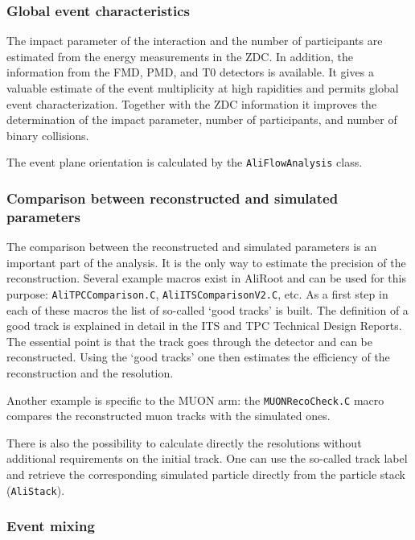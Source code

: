 \documentclass[12pt,a4paper,twoside]{article}
\makeatletter
\newcommand {\aliroot} {AliRoot\@\xspace}
\makeatother
\begin{document}
{\subsubsection{Global event characteristics}

The impact parameter of the interaction and the number of participants
are estimated from the energy measurements in the ZDC. In addition,
the information  from the FMD, PMD, and T0 detectors is available. It
gives a valuable estimate of the event multiplicity at high rapidities
and permits global event characterization. Together with the ZDC
information it improves the determination of the impact parameter,
number of participants, and number of binary collisions.

The event plane orientation is calculated by the \texttt{AliFlowAnalysis} class.

\subsubsection{Comparison between reconstructed and simulated parameters}

The comparison between the reconstructed and simulated parameters is
an important part of the analysis. It is the only way to estimate the
precision of the reconstruction. Several example macros exist in
\aliroot and can be used for this purpose: \texttt{AliTPCComparison.C},
\texttt{AliITSComparisonV2.C}, etc. As a first step in each of these
macros the list of so-called `good tracks' is built. The definition of
a good track is explained in detail in the ITS\cite{CH6Ref:ITS_TDR} and 
TPC\cite{CH6Ref:TPC_TDR} Technical Design
Reports.  The essential point is that the track
goes through the detector and can be reconstructed. Using the `good
tracks' one then estimates the efficiency of the reconstruction and
the resolution.

Another example is specific to the MUON arm: the \texttt{MUONRecoCheck.C}
macro compares the reconstructed muon tracks with the simulated ones.

There is also the possibility to calculate directly the resolutions without
additional requirements on the initial track. One can use the
so-called track label and retrieve the corresponding simulated
particle directly from the particle stack (\texttt{AliStack}).

\subsubsection{Event mixing}

}
\end{document}
